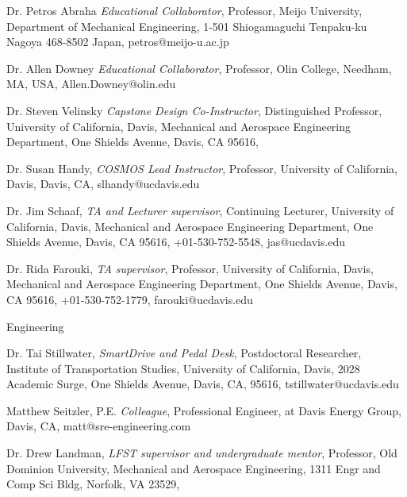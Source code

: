 \documentclass[10pt]{article}
\newenvironment{outerlist}[1][\enskip\textbullet]%
        {\begin{itemize}[#1]}{\end{itemize}%
         \vspace{-.6\baselineskip}}
\newenvironment{innerlist}[1][\enskip\textbullet]%
        {\begin{compactitem}[#1]}{\end{compactitem}}
\begin{document}
\begin{outerlist}
\begin{innerlist}
      \item Dr. Petros Abraha
        \emph{Educational Collaborator},
        Professor,
        Meijo University,
        Department of Mechanical Engineering,
        1-501 Shiogamaguchi Tenpaku-ku Nagoya 468-8502 Japan,
        petros@meijo-u.ac.jp
      \item Dr. Allen Downey
        \emph{Educational Collaborator},
        Professor,
        Olin College,
        Needham, MA, USA,
        Allen.Downey@olin.edu
      \item Dr. Steven Velinsky
        \emph{Capstone Design Co-Instructor},
        Distinguished Professor,
        University of California, Davis,
        Mechanical and Aerospace Engineering Department,
        One Shields Avenue, Davis, CA 95616,
      \item Dr. Susan Handy,
        \emph{COSMOS Lead Instructor},
        Professor,
        University of California, Davis,
        Davis, CA,
        slhandy@ucdavis.edu
      \item Dr. Jim Schaaf,
        \emph{TA and Lecturer supervisor},
        Continuing Lecturer,
        University of California, Davis,
        Mechanical and Aerospace Engineering Department,
        One Shields Avenue, Davis, CA 95616,
        +01-530-752-5548,
        jas@ucdavis.edu
      \item Dr. Rida Farouki,
        \emph{TA supervisor},
        Professor,
        University of California, Davis,
        Mechanical and Aerospace Engineering Department,
        One Shields Avenue, Davis, CA 95616,
        +01-530-752-1779,
        farouki@ucdavis.edu
    \end{innerlist}
  \item[] Engineering
    \begin{innerlist}
      \item Dr. Tai Stillwater,
        \emph{SmartDrive and Pedal Desk},
        Postdoctoral Researcher,
        Institute of Transportation Studies,
        University of California, Davis,
        2028 Academic Surge, One Shields Avenue, Davis, CA, 95616,
        tstillwater@ucdavis.edu
      \item Matthew Seitzler, P.E. \emph{Colleague},
        Professional Engineer, at Davis Energy Group, Davis, CA,
        matt@sre-engineering.com
      \item Dr. Drew Landman,
        \emph{LFST supervisor and undergraduate mentor},
        Professor,
        Old Dominion University,
        Mechanical and Aerospace Engineering,
        1311 Engr and Comp Sci Bldg, Norfolk, VA 23529,

\end{innerlist}
\end{outerlist}
\end{document}
